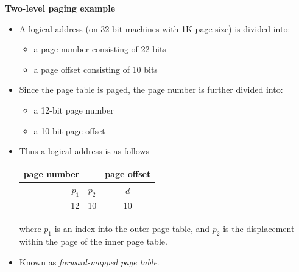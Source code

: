 \documentclass[11pt,a4paper]{article}
\begin{document}
\textbf{Two-level paging example}
\begin{itemize}
    \item A logical address (on 32-bit machines with 1K page size) is divided into:
        \begin{itemize}
            \item a page number consisting of 22 bits
            \item a page offset consisting of 10 bits
        \end{itemize}
    \item Since the page table is paged, the page number is further divided into:
        \begin{itemize}
            \item a 12-bit page number
            \item a 10-bit page offset
        \end{itemize}
    \item Thus a logical address is as follows

        \begin{tabular}{r c c}
            \toprule
            page number &       & page offset \\
            \midrule
            $p_1$       & $p_2$ & $d$ \\
            12          & 10    & 10 \\
            \bottomrule
        \end{tabular}

        where $p_1$ is an index into the outer page table, and $p_2$ is the displacement
        within the page of the inner page table.
    \item Known as \emph{forward-mapped page table}.
\end{itemize}
\end{document}
